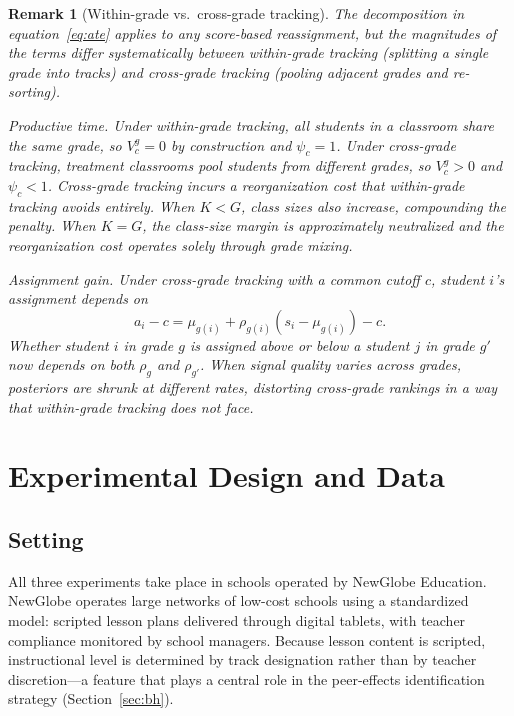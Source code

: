 \documentclass[11pt]{article}
\newtheorem{remark}{Remark}
\begin{document}
\begin{remark}[Within-grade vs.\ cross-grade tracking]
\label{rem:wg_cg}
The decomposition in equation~\eqref{eq:ate} applies to any score-based reassignment, but the magnitudes of the terms differ systematically between within-grade tracking (splitting a single grade into tracks) and cross-grade tracking (pooling adjacent grades and re-sorting).

\emph{Productive time.} Under within-grade tracking, all students in a classroom share the same grade, so $V^g_c = 0$ by construction and $\psi_c = 1$. Under cross-grade tracking, treatment classrooms pool students from different grades, so $V^g_c > 0$ and $\psi_c < 1$. Cross-grade tracking incurs a reorganization cost that within-grade tracking avoids entirely. When $K < G$, class sizes also increase, compounding the penalty. When $K = G$, the class-size margin is approximately neutralized and the reorganization cost operates solely through grade mixing.

\emph{Assignment gain.} Under cross-grade tracking with a common cutoff $c$, student $i$'s assignment depends on
\begin{equation}
\label{eq:cg_assign}
a_i - c = \mu_{g(i)} + \rho_{g(i)}(s_i - \mu_{g(i)}) - c.
\end{equation}
Whether student $i$ in grade $g$ is assigned above or below a student $j$ in grade $g'$ now depends on both $\rho_g$ and $\rho_{g'}$. When signal quality varies across grades, posteriors are shrunk at different rates, distorting cross-grade rankings in a way that within-grade tracking does not face.
\end{remark}

\section{Experimental Design and Data}
\label{sec:design}

\subsection{Setting}

All three experiments take place in schools operated by NewGlobe Education. NewGlobe operates large networks of low-cost schools using a standardized model: scripted lesson plans delivered through digital tablets, with teacher compliance monitored by school managers. Because lesson content is scripted, instructional level is determined by track designation rather than by teacher discretion---a feature that plays a central role in the peer-effects identification strategy (Section~\ref{sec:bh}).
\end{document}

